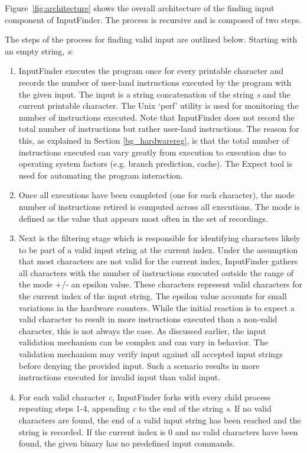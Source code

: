 \documentclass{acm_proc_article-sp}
\def \tool {InputFinder}
\begin{document}
Figure~\ref{fig:architecture} shows the overall architecture of the finding input component of \tool{}.
The process is recursive and is composed of two steps.

The steps of the process for finding valid input are outlined below. Starting with an empty string, \textit{s}:
\begin{enumerate}
\item \tool{} executes the program once for every printable character and records the number of user-land instructions executed by the program with the given input. The input is a string concatenation of the string \textit{s} and the current printable character. The Unix `perf' utility is used for monitoring the number of instructions executed. Note that \tool{} does not record the total number of instructions but rather user-land instructions. The reason for this, as explained in Section \ref{bg_hardwarereg}, is that the total number of instructions executed can vary greatly from execution to execution due to operating system factors (e.g. branch prediction, cache). The Expect tool is used for automating the program interaction.
\item Once all executions have been completed (one for each character), the mode number of instructions retired is computed across all executions. The mode is defined as the value that appears most often in the set of recordings.
\item Next is the filtering stage which is responsible for identifying characters likely to be part of a valid input string at the current index. Under the assumption that most characters are not valid for the current index, \tool{} gathers all characters with the number of instructions executed outside the range of the mode +/- an epsilon value. These characters represent valid characters for the current index of the input string. The epsilon value accounts for small variations in the hardware counters. While the initial reaction is to expect a valid character to result in more instructions executed than a non-valid character, this is not always the case. As discussed earlier, the input validation mechanism can be complex and can vary in behavior. The validation mechanism may verify input against all accepted input strings before denying the provided input. Such a scenario results in more instructions executed for invalid input than valid input.
\item For each valid character \textit{c}, \tool{} forks with every child process repeating steps 1-4, appending \textit{c} to the end of the string \textit{s}. If no valid characters are found, the end of a valid input string has been reached and the string is recorded. If the current index is 0 and no valid characters have been found, the given binary has no predefined input commands.
\end{enumerate}
\end{document}
